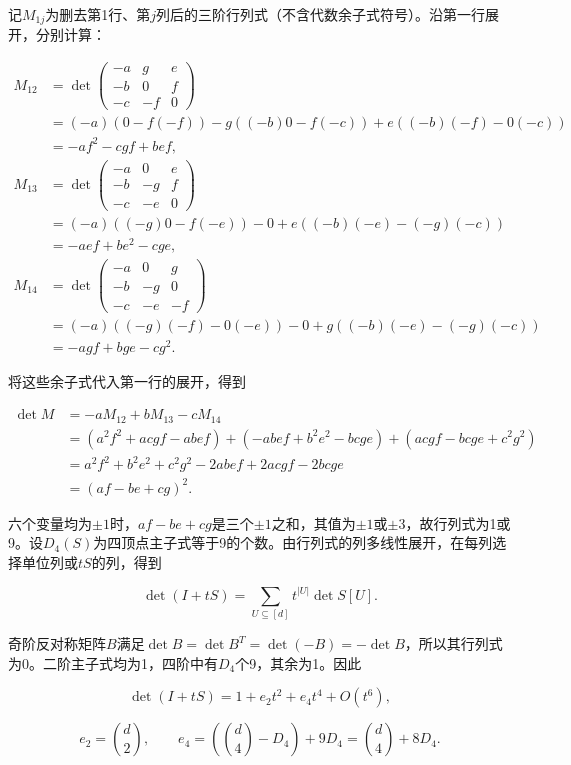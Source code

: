 \documentclass[11pt,a4paper]{article}
\begin{document}
记\(M_{1j}\)为删去第1行、第\(j\)列后的三阶行列式（不含代数余子式符号）。沿第一行展开，分别计算：

\[
\begin{aligned}
M_{12}
&=\det\begin{pmatrix}-a&g&e\\-b&0&f\\-c&-f&0\end{pmatrix}\\
&=(-a)(0-f(-f))-g((-b)0-f(-c))+e((-b)(-f)-0(-c))\\
&=-af^2-cgf+bef,\\
M_{13}
&=\det\begin{pmatrix}-a&0&e\\-b&-g&f\\-c&-e&0\end{pmatrix}\\
&=(-a)((-g)0-f(-e))-0+e((-b)(-e)-(-g)(-c))\\
&=-aef+be^2-cge,\\
M_{14}
&=\det\begin{pmatrix}-a&0&g\\-b&-g&0\\-c&-e&-f\end{pmatrix}\\
&=(-a)((-g)(-f)-0(-e))-0+g((-b)(-e)-(-g)(-c))\\
&=-agf+bge-cg^2.
\end{aligned}
\]

将这些余子式代入第一行的展开，得到

\[
\begin{aligned}
\det M
&=-aM_{12}+bM_{13}-cM_{14}\\
&=(a^2f^2+acgf-abef)
+(-abef+b^2e^2-bcge)
+(acgf-bcge+c^2g^2)\\
&=a^2f^2+b^2e^2+c^2g^2-2abef+2acgf-2bcge\\
&=(af-be+cg)^2.
\end{aligned}
\]

六个变量均为\(\pm1\)时，\(af-be+cg\)是三个\(\pm1\)之和，其值为\(\pm1\)或\(\pm3\)，故行列式为1或9。设\(D_4(S)\)为四顶点主子式等于9的个数。由行列式的列多线性展开，在每列选择单位列或\(tS\)的列，得到

\[
\det(I+tS)=\sum_{U\subseteq[d]}t^{|U|}\det S[U].
\]

奇阶反对称矩阵\(B\)满足\(\det B=\det B^T=\det(-B)=-\det B\)，所以其行列式为0。二阶主子式均为1，四阶中有\(D_4\)个9，其余为1。因此

\[
\det(I+tS)=1+e_2t^2+e_4t^4+O(t^6),
\]

\[
e_2=\binom d2,\qquad
e_4=(\binom d4-D_4)+9D_4=\binom d4+8D_4.
\]
\end{document}
